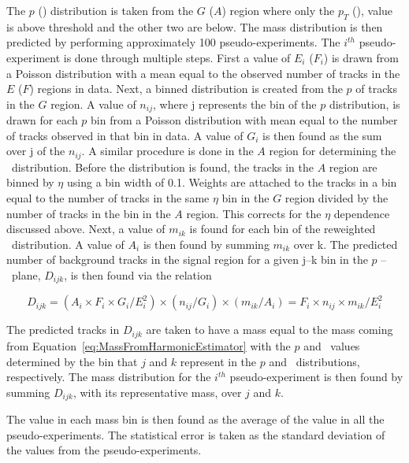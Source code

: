 The $p$ (\ih) distribution
is taken from the $G$ ($A$) region where only the $p_T$  (\ias), value is above threshold and the other two are below. The mass distribution is then predicted by performing
approximately 100 pseudo-experiments. The $i^{th}$ pseudo-experiment is done through multiple steps. First a value of $E_{i}$ ($F_i$) is drawn from a Poisson
distribution with a mean equal to the observed number of tracks in the $E$ ($F$) regions in data.
Next, a binned distribution is created from the $p$ of tracks in the $G$ region. A value of $n_{ij}$, where j represents the bin of the $p$ distribution, is drawn for
each $p$ bin from a Poisson distribution with mean equal to the number of tracks observed in that bin in data. A value of $G_i$ is then found as the sum over j of the
$n_{ij}$. A similar procedure is done in the $A$ region for determining the \ih\ distribution. Before the distribution is found, 
the tracks in the $A$ region are binned by $\eta$ using a bin width of 0.1. Weights are attached to the tracks in a bin equal to the number of tracks in the
same $\eta$ bin in the $G$ region divided by the number of tracks in the bin in the $A$ region. This corrects for the $\eta$ dependence discussed above.
Next, a value of $m_{ik}$ is found for each bin of the reweighted \ih\ distribution. A value of $A_i$ is then found by summing $m_{ik}$ over k.
The predicted number of background tracks in the signal region for a given j--k bin in the $p$ -- \dedx\ plane, $D_{ijk}$, is then found via the relation

\begin{equation}
D_{ijk} = (A_i \times F_i \times G_i / E_{i}^{2}) \times (n_{ij}/G_i) \times (m_{ik}/A_i) = F_i \times n_{ij} \times m_{ik} / E_{i}^{2}
\label{eq:MassPrediction}
\end{equation}

The predicted tracks in $D_{ijk}$ are taken to have a mass equal to the mass coming from Equation~\ref{eq:MassFromHarmonicEstimator} with the $p$ and \ih\ values
determined by the bin that $j$ and $k$ represent in the $p$ and \ih\ distributions, respectively. The mass distribution for the $i^{th}$ pseudo-experiment is then
found by summing $D_{ijk}$, with its representative mass, over $j$ and $k$.

The value in each mass bin is then found as the average of the value in all the pseudo-experiments. The statistical error is taken as the standard deviation of the values from
the pseudo-experiments.

